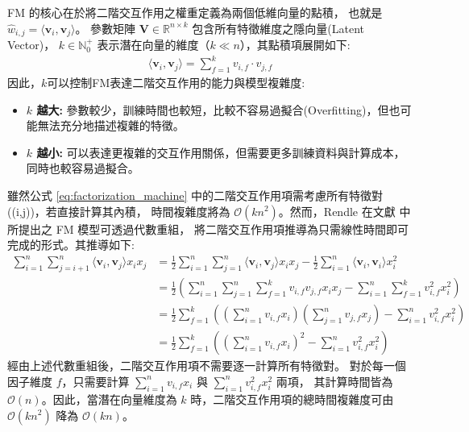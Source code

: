 FM 的核心在於將二階交互作用之權重定義為兩個低維向量的點積，
也就是 $\hat{w}_{i,j} = \langle \mathbf{v}_i, \mathbf{v}_j \rangle$。
參數矩陣 $\mathbf{V} \in \mathbb{R}^{n \times k}$ 包含所有特徵維度之隱向量(Latent Vector)，
$k \in \mathbb{N}_{0}^{+}$ 表示潛在向量的維度（$k \ll n$），其點積項展開如下:
\begin{align}
\langle \mathbf{v}_i, \mathbf{v}_j \rangle = \sum_{f=1}^{k} v_{i,f} \cdot v_{j,f}
\label{eq:fm_dot_product}
\end{align}
因此，$k$可以控制FM表達二階交互作用的能力與模型複雜度:
\begin{itemize}
    \item  \textbf{$k$ 越大:} 參數較少，訓練時間也較短，比較不容易過擬合(Overfitting)，但也可能無法充分地描述複雜的特徵。
    \item  \textbf{$k$ 越小:} 可以表達更複雜的交互作用關係，但需要更多訓練資料與計算成本，同時也較容易過擬合。
\end{itemize}

雖然公式 \eqref{eq:factorization_machine} 中的二階交互作用項需考慮所有特徵對 ((i,j))，若直接計算其內積，
時間複雜度將為 $\mathcal{O}(kn^2)$。然而，Rendle 在文獻 \cite{rendle2010_factorization} 中所提出之 FM 模型可透過代數重組，
將二階交互作用項推導為只需線性時間即可完成的形式。其推導如下:
\begin{align}
\sum_{i=1}^{n} \sum_{j=i+1}^{n} \langle \mathbf{v}_i, \mathbf{v}_j \rangle x_i x_j 
&= \frac{1}{2} \sum_{i=1}^{n} \sum_{j=1}^{n} \langle \mathbf{v}_i, \mathbf{v}_j \rangle x_i x_j - \frac{1}{2} \sum_{i=1}^{n} \langle \mathbf{v}_i, \mathbf{v}_i \rangle x_i^2 \nonumber \\
&= \frac{1}{2} \left( \sum_{i=1}^{n} \sum_{j=1}^{n} \sum_{f=1}^{k} v_{i,f} v_{j,f} x_i x_j - \sum_{i=1}^{n} \sum_{f=1}^{k} v_{i,f}^2 x_i^2 \right) \nonumber \\
&= \frac{1}{2} \sum_{f=1}^{k} \left( \left( \sum_{i=1}^{n} v_{i,f} x_i \right) \left( \sum_{j=1}^{n} v_{j,f} x_j \right) - \sum_{i=1}^{n} v_{i,f}^2 x_i^2 \right) \nonumber \\
&= \frac{1}{2} \sum_{f=1}^{k} \left( \left( \sum_{i=1}^{n} v_{i,f} x_i \right)^2 - \sum_{i=1}^{n} v_{i,f}^2 x_i^2 \right)
\label{eq:fm_linear_time}
\end{align}
經由上述代數重組後，二階交互作用項不需要逐一計算所有特徵對。
對於每一個因子維度 $f$，只需要計算 $\sum_{i=1}^{n} v_{i,f}x_i$ 與 $\sum_{i=1}^{n} v_{i,f}^{2}x_i^{2}$ 兩項，
其計算時間皆為 $\mathcal{O}(n)$。因此，當潛在向量維度為 $k$ 時，二階交互作用項的總時間複雜度可由 $\mathcal{O}(kn^2)$ 降為 $\mathcal{O}(kn)$。

